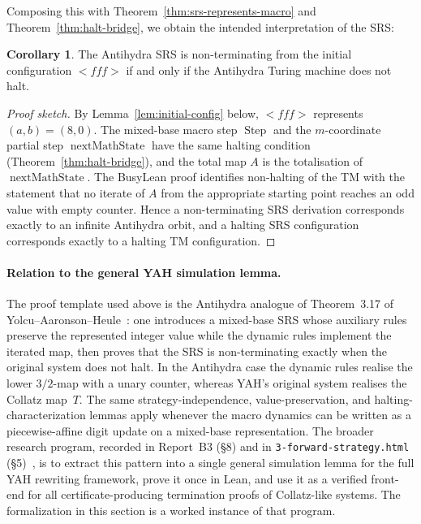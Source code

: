 \documentclass[11pt,a4paper]{article}
\theoremstyle{definition}
\newtheorem{corollary}[definition]{Corollary}
\newcommand{\lt}{<}
\newcommand{\gt}{>}
\newcommand{\macroStep}{\operatorname{Step}}
\newcommand{\nextMathState}{\operatorname{nextMathState}}
\begin{document}
Composing this with Theorem~\ref{thm:srs-represents-macro} and
Theorem~\ref{thm:halt-bridge}, we obtain the intended interpretation of
the SRS:

\begin{corollary}
  \label{cor:srs-tm}
  The Antihydra SRS is non-terminating from the initial configuration
  $\lt fff\gt$ if and only if the Antihydra Turing machine does not
  halt.
\end{corollary}

\begin{proof}[Proof sketch]
  By Lemma~\ref{lem:initial-config} below, $\lt fff\gt$ represents
  $(a,b)=(8,0)$.  The mixed-base macro step $\macroStep$ and the
  $m$-coordinate partial step $\nextMathState$ have the same halting
  condition (Theorem~\ref{thm:halt-bridge}), and the total map $A$ is
  the totalisation of $\nextMathState$.  The BusyLean proof identifies
  non-halting of the TM with the statement that no iterate of $A$ from
  the appropriate starting point reaches an odd value with empty counter.
  Hence a non-terminating SRS derivation corresponds exactly to an
  infinite Antihydra orbit, and a halting SRS configuration corresponds
  exactly to a halting TM configuration.
\end{proof}

\paragraph{Relation to the general YAH simulation lemma.}
The proof template used above is the Antihydra analogue of
Theorem~3.17 of Yolcu--Aaronson--Heule~\cite[pp.~20--21]{YAH21}: one
introduces a mixed-base SRS whose auxiliary rules preserve the
represented integer value while the dynamic rules implement the iterated
map, then proves that the SRS is non-terminating exactly when the
original system does not halt.  In the Antihydra case the dynamic rules
realise the lower $3/2$-map with a unary counter, whereas YAH's original
system realises the Collatz map~$T$.  The same strategy-independence,
value-preservation, and halting-characterization lemmas apply whenever
the macro dynamics can be written as a piecewise-affine digit update on a
mixed-base representation.  The broader research program, recorded in
Report~B3 (\S8) and in \texttt{3-forward-strategy.html}
(\S5)~\cite{ReportB3,ForwardStrategy}, is to extract this pattern into a
single general simulation lemma for the full YAH rewriting framework,
prove it once in Lean, and use it as a verified front-end for all
certificate-producing termination proofs of Collatz-like systems.  The
formalization in this section is a worked instance of that program.
\end{document}
